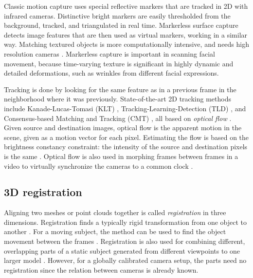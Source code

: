 
Classic motion capture uses special reflective markers that are tracked in 2D with infrared cameras.
Distinctive bright markers are easily thresholded from the background, tracked, and triangulated in real time.
Markerless surface capture detects image features that are then used as virtual markers, working in a similar way.
Matching textured objects is more computationally intensive, and needs high resolution cameras \cite{moeslund2001survey}.
Markerless capture is important in scanning facial movement, because time-varying texture is significant in highly dynamic and detailed deformations, such as wrinkles from different facial expressions.
\cite{bradley2008markerless,beeler2011high,bradley2010high}

Tracking is done by looking for the same feature as in a previous frame in the neighborhood where it was previously.
State-of-the-art 2D tracking methods include Kanade-Lucas-Tomasi (KLT) \cite{lucas1981iterative,tomasi1991detection}, Tracking-Learning-Detection (TLD) \cite{kalal2012tracking}, and Consensus-based Matching and Tracking (CMT) \cite{nebehay2014consensus}, all based on \emph{optical flow} \cite{horn1981determining,gibson1950perception,beauchemin1995computation}.
Given source and destination images, optical flow is the apparent motion in the scene, given as a motion vector for each pixel.
Estimating the flow is based on the brightness constancy constraint: the intensity of the source and destination pixels is the same \cite{horn1974determining}.
Optical flow is also used in morphing frames between frames in a video to virtually synchronize the cameras to a common clock \cite{bradley2009synchronization}.



\subsection{3D registration} %

Aligning two meshes or point clouds together is called \emph{registration} in three dimensions.
Registration finds a typically rigid transformation from one object to another \cite{zhang1994iterative,rusinkiewicz2001efficient}.
For a moving subject, the method can be used to find the object movement between the frames \cite{pons2005modelling,zhao2005alignment}.
Registration is also used for combining different, overlapping parts of a static subject generated from different viewpoints to one larger model \cite{eggert1998simultaneous,huber2003fully}.
However, for a globally calibrated camera setup, the parts need no registration since the relation between cameras is already known.

